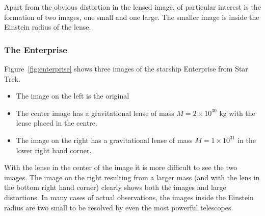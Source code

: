 \documentclass[a4paper]{IEEEtran}
\begin{document}
Apart from the obvious distortion in the lensed image, of particular
interest is the formation of two images, one small and one large.
The smaller image is inside the Einstein radius of the lense.

\subsubsection{The Enterprise}
Figure~\ref{fig:enterprise} shows three images of the starship Enterprise
from Star Trek. 
\begin{itemize}
    \item The image on the left is the original
    \item The center image has a gravitational lense of mass
          $M = 2 \times 10^{30}$ kg with the lense placed in the 
          centre.
    \item The image on the right has a gravitational lense of
          mass $M = 1 \times 10^{31}$ in the lower right hand corner.
\end{itemize}

With the lense in the center of the image it is more difficult to 
see the two images. The image on the right resulting from a larger
mass (and with the lens in the bottom right hand corner)
clearly shows both the images and large distortions.
In many cases of actual observations, the images inside the Einstein radius
are two small to be resolved by even the most powerful telescopes.
\end{document}
